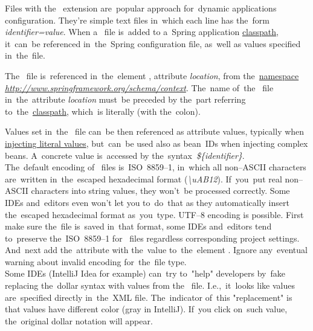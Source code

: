 Files with the~ extension are~popular approach for~dynamic applications configuration.
They're simple text files in~which each line has the~form \textit{identifier=value}.
When a~ file is~added to a~Spring application \hyperref[classpath]{classpath}, it~can~be referenced in~the~Spring configuration file, as~well as values specified in~the~file.

The~ file is~referenced in~the~element , attribute \textit{location}, from the~\hyperref[namespaces]{namespace} \textit{\href{http://www.springframework.org/schema/context}{http://www.springframework.org/schema/context}}.
The~name of~the~ file in~the~attribute \textit{location} must~be preceded by the~part referring to~the~\hyperref[classpath]{classpath}, which~is literally  (with the~colon).

Values set in~the~ file can~be then referenced as attribute values, typically when \hyperref[injectingliteralvalues]{injecting literal values}, but~can~be used also as bean~IDs when injecting complex beans.
A~concrete value is~accessed by the~syntax~\textit{\$\{identifier\}}.\\

\warning The~default encoding of~ files is~\mbox{ISO~8859--1}, in~which all non--ASCII characters are~written in~the~escaped hexadecimal format (\textit{\textbackslash uAB12}).
If~you~put real non--ASCII characters into string values, they won't~be processed correctly.
Some IDEs and~editors even won't let you to~do~that as they automatically insert the~escaped hexadecimal format as~you~type.
UTF--8 encoding is possible.
First make sure the~file is~saved in~that format, some IDEs and~editors tend to~preserve the~\mbox{ISO~8859--1} for~ files regardless corresponding project settings.
And~next add the~attribute  with the~value  to~the~element .
Ignore any~eventual warning about invalid encoding for~the~file type.\\

\warning Some IDEs (IntelliJ Idea for example) can~try to~"help" developers by~fake replacing the~dollar syntax with values from the~ file.
I.e.,~it~looks like values are~specified directly in~the~XML file.
The~indicator of~this "replacement" is that values have different color (gray in IntelliJ).
If~you click on~such value, the~original dollar notation will appear.

